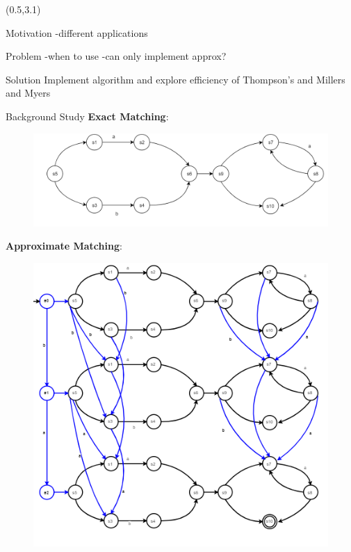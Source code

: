 \documentclass[22pt]{beamer}
\begin{document}
\begin{frame}[fragile]
\begin{textblock}{7.25}(0.5,3.1)

\begin{block}{Motivation}
-different applications

\end{block}

\begin{block}{Problem}
-when to use
-can only implement approx?
\end{block}

\begin{block}{Solution}
Implement algorithm and explore efficiency of Thompson's and Millers and Myers
\end{block}


\begin{block}{Background Study}
\textbf{Exact Matching}:

\begin{figure}
\includegraphics[scale=1.5]{ThompsonsNFA.PNG}
\end{figure}

\vspace{5mm} %



\textbf{Approximate Matching}:


\begin{figure}
\includegraphics[scale=2]{MillerAndMyersAlgorithm.PNG}
\end{figure}


\end{block}
\end{textblock}
\end{frame}
\end{document}
